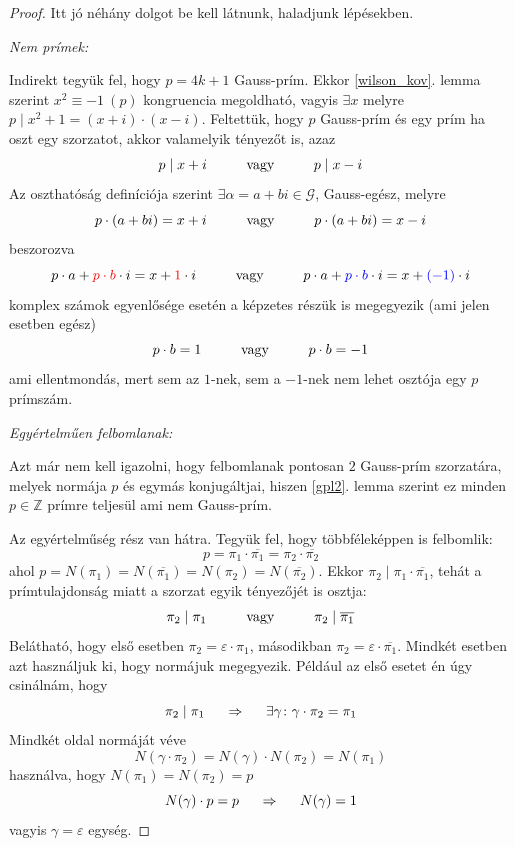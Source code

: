 \documentclass[12pt]{book}
\theoremstyle{plain} %
\theoremstyle{definition} %
\theoremstyle{remark}
\numberwithin{equation}{section}  %
\def\Z{\mathbb{Z}}
\def\G{\mathcal{G}}
\begin{document}
	\begin{proof}
		Itt jó néhány dolgot be kell látnunk, haladjunk lépésekben.
		
		\textit{Nem prímek:}
		
		Indirekt tegyük fel, hogy $p=4k+1$ Gauss-prím. Ekkor \ref{wilson_kov}. lemma szerint $x^2\equiv -1\ (p)$ kongruencia megoldható, vagyis $\exists x$ melyre $p\mid x^2+1 = (x+i)\cdot (x-i)$. Feltettük, hogy $p$ Gauss-prím és egy prím ha oszt egy szorzatot, akkor valamelyik tényezőt is, azaz
		\[ p\mid x+i  \hspace{10mm} \text{vagy} \hspace{10mm} p\mid x-i \]
		Az oszthatóság definíciója szerint $\exists \alpha = a+bi \in \G$, Gauss-egész, melyre
		\[ p\cdot (a+bi) = x+i  \hspace{10mm} \text{vagy} \hspace{10mm} p\cdot (a+bi) = x-i \]
		beszorozva
		\[ p\cdot a+\color{red} p\cdot b\color{black} \cdot i = x+\color{red} 1\color{black}\cdot i  \hspace{10mm} \text{vagy} \hspace{10mm} p\cdot a + \color{blue} p\cdot b \color{black} \cdot i = x+\color{blue} (-1) \color{black} \cdot i \]
		komplex számok egyenlősége esetén a képzetes részük is megegyezik (ami jelen esetben egész)
		\[ p\cdot b = 1 \hspace{10mm} \text{vagy} \hspace{10mm} p\cdot b = -1 \]
		ami ellentmondás, mert sem az $1$-nek, sem a $-1$-nek nem lehet osztója egy $p$ prímszám.
		
		\textit{Egyértelműen felbomlanak:}
		
		Azt már nem kell igazolni, hogy felbomlanak pontosan $2$ Gauss-prím szorzatára, melyek normája $p$ és egymás konjugáltjai, hiszen \ref{gpl2}. lemma szerint ez minden $p\in \Z$ prímre teljesül ami nem Gauss-prím.
		
		Az egyértelműség rész van hátra. Tegyük fel, hogy többféleképpen is felbomlik:
		\[ p=\pi_1\cdot \overline{\pi_1} = \pi_2 \cdot \overline{\pi_2} \]
		ahol $p=N(\pi_1) = N(\overline{\pi_1})=N(\pi_2) = N(\overline{\pi_2})$. Ekkor $\pi_2 \mid \pi_1\cdot \overline{\pi_1}$, tehát a prímtulajdonság miatt a szorzat egyik tényezőjét is osztja:
		\[ \pi_2 \mid \pi_1 \hspace{10mm} \text{vagy} \hspace{10mm} \pi_2\mid \overline{\pi_1}  \]
		Belátható, hogy első esetben $\pi_2 = \varepsilon \cdot \pi_1$, másodikban $\pi_2 = \varepsilon \cdot \overline{\pi_1}$. Mindkét esetben azt használjuk ki, hogy normájuk megegyezik. Például az első esetet én úgy csinálnám, hogy
		\[ \pi_2 \mid \pi_1 \hspace{5mm} \Rightarrow \hspace{5mm} \exists \gamma\colon \gamma\cdot \pi_2 = \pi_1  \]
		Mindkét oldal normáját véve
		\[ N(\gamma\cdot \pi_2) = N(\gamma) \cdot N(\pi_2) = N(\pi_1) \]
		használva, hogy $N(\pi_1)=N(\pi_2)=p$
		\[ N(\gamma)\cdot p = p \hspace{5mm} \Rightarrow \hspace{5mm} N(\gamma) = 1 \]
		vagyis $\gamma = \varepsilon$ egység.
		

\end{proof}
\end{document}
